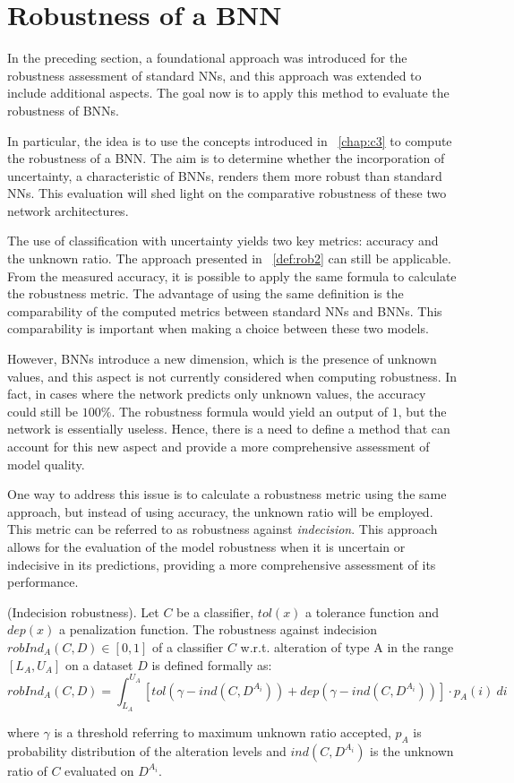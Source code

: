 \section{Robustness of a BNN}

In the preceding section, a foundational approach was introduced for the robustness assessment of standard NNs, and this approach was extended to include additional aspects. The goal now is to apply this method to evaluate the robustness of BNNs.

In particular, the idea is to use the concepts introduced in \Chap~\ref{chap:c3} to compute the robustness of a BNN. The aim is to determine whether the incorporation of uncertainty, a characteristic of BNNs, renders them more robust than standard NNs. This evaluation will shed light on the comparative robustness of these two network architectures.

The use of classification with uncertainty yields two key metrics: accuracy and the unknown ratio. The approach presented in \Def~\ref{def:rob2} can still be applicable. From the measured accuracy, it is possible to apply the same formula to calculate the robustness metric. The advantage of using the same definition is the comparability of the computed metrics between standard NNs and BNNs. This comparability is important when making a choice between these two models.

However, BNNs introduce a new dimension, which is the presence of unknown values, and this aspect is not currently considered when computing robustness. In fact, in cases where the network predicts only unknown values, the accuracy could still be $100\%$. The robustness formula would yield an output of $1$, but the network is essentially useless. Hence, there is a need to define a method that can account for this new aspect and provide a more comprehensive assessment of model quality.

One way to address this issue is to calculate a robustness metric using the same approach, but instead of using accuracy, the unknown ratio will be employed. This metric can be referred to as robustness against \textit{indecision}. This approach allows for the evaluation of the model robustness when it is uncertain or indecisive in its predictions, providing a more comprehensive assessment of its performance.

\begin{definition}\label{def:robind} (Indecision robustness).
	Let $C$ be a classifier, $tol(x)$ a tolerance function and $dep(x)$ a penalization function.
	The robustness against indecision $robInd_A(C,D) \in [0,1]$ of a classifier $C$ w.r.t. alteration of type A in the range $[L_A, U_A]$ on a dataset $D$ is defined formally as:
	\[
		robInd_A(C,D) = \int_{L_A}^{U_A} [tol(\gamma - ind(C,D^{A_i})) + dep(\gamma - ind(C,D^{A_i}))] \cdot p_A(i)\ di
	\]
	
	where $\gamma$ is a threshold referring to maximum unknown ratio accepted, $p_A$ is probability distribution of the alteration levels and $ind(C,D^{A_i})$ is the unknown ratio of $C$ evaluated on $D^{A_i}$.
\end{definition}

